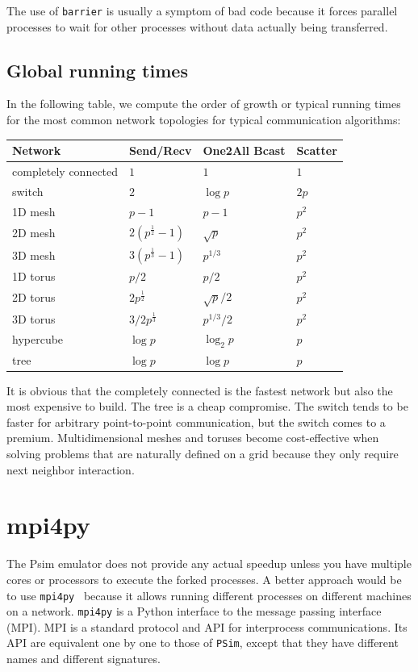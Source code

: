 \documentclass[justified,sixbynine]{tufte-book}
\def\ft{\small\tt}
\theoremstyle{plain}%
\theoremstyle{definition}
\theoremstyle{remark}
\begin{document}
\begin{fullwidth}
The use of {\ft barrier} is usually a symptom of bad code because it forces parallel processes to wait for other processes without data actually being transferred.

\goodbreak\subsection{Global running times}

In the following table, we compute the order of growth or typical running times for the most common network topologies for typical communication algorithms:

\begin{tabular}{|l|lll|} \hline
Network & Send/Recv & One2All Bcast & Scatter \\ \hline
completely connected & $1$ & $1$ & $1$ \\
switch  & $2$ & $\log p$ & $2p$ \\
1D mesh  & $p-1$ & $p-1$ & $p^2$ \\
2D mesh  & $2(p^{\frac12}-1)$ & $\sqrt{p}$ & $p^2$ \\
3D mesh  & $3(p^{\frac13}-1)$ & $p^{1/3}$ & $p^2$ \\
1D torus  & $p/2$ & $p/2$ & $p^2$ \\
2D torus  & $2p^{\frac12}$ & $\sqrt{p}/2$ & $p^2$ \\
3D torus  & $3/2 p^{\frac13}$ & $p^{1/3}/2$ & $p^2$ \\
hypercube  & $\log p$ & $\log_2 p$ & $p$ \\
tree  & $\log p$ & $\log p$ & $p$
\\ \hline
\end{tabular}

It is obvious that the completely connected is the fastest network but also the most expensive to build. The tree is a cheap compromise. The switch tends to be faster for arbitrary point-to-point communication, but the switch comes to a premium. Multidimensional meshes and toruses become cost-effective when solving problems that are naturally defined on a grid because they only require next neighbor interaction.

\goodbreak\section{mpi4py}

The Psim emulator does not provide any actual speedup unless you have multiple cores or processors to execute the forked processes. A better approach would be to use {\ft mpi4py}~\cite{mpi4py} because it allows running different processes on different machines on a network. {\ft mpi4py} is a Python interface to the message passing interface (MPI). MPI is a standard protocol and API for interprocess communications. Its API are equivalent one by one to those of {\ft PSim}, except that they have different names and different signatures.


\end{fullwidth}
\end{document}
